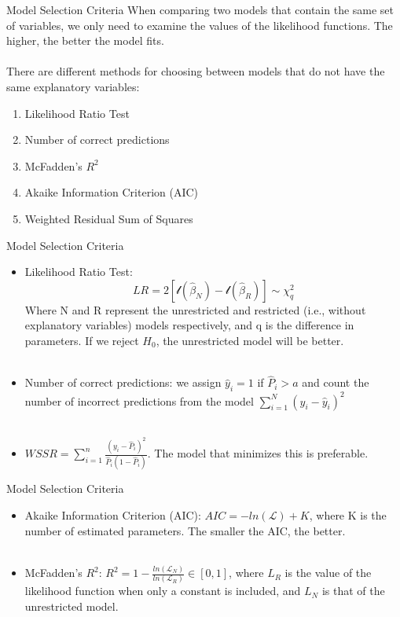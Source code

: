 \documentclass[notes,10pt, aspectratio=169]{beamer}
\begin{document}
\begin{frame}{Model Selection Criteria}
When comparing two models that contain the same set of variables, we only need to examine the values of the likelihood functions. The higher, the better the model fits.\\~\\
There are different methods for choosing between models that do not have the same explanatory variables:
\begin{enumerate}
    \item Likelihood Ratio Test
    \item Number of correct predictions
    \item McFadden's $R^2$
    \item Akaike Information Criterion (AIC)
    \item Weighted Residual Sum of Squares
\end{enumerate}
\end{frame}

\begin{frame}{Model Selection Criteria}
\begin{itemize}
    \item Likelihood Ratio Test:
    \[
    LR=2[\mathscr{l}(\hat{\beta}_N)-\mathscr{l}(\hat{\beta}_R)] \sim \chi_q^2
    \]
Where N and R represent the unrestricted and restricted (i.e., without explanatory variables) models respectively, and q is the difference in parameters. If we reject $H_0$, the unrestricted model will be better. \\~\\

\item Number of correct predictions: we assign $\hat{y}_i=1$ if $\hat{P}_i>a$ and count the number of incorrect predictions from the model $\sum_{i=1}^N (y_i-\hat{y}_i)^2$\\~\\
\item $WSSR=\sum_{i=1}^n \frac{(y_i-\hat{P}_i)^2}{\hat{P}_i(1-\hat{P}_i)}$. The model that minimizes this is preferable.
\end{itemize}
\end{frame}

\begin{frame}{Model Selection Criteria}
\begin{itemize}
    \item Akaike Information Criterion (AIC): $AIC=-ln(\mathcal{L})+K$, where K is the number of estimated parameters. The smaller the AIC, the better.\\~\\
    \item McFadden's $R^2$: $R^2=1-\frac{ln(\mathcal{L}_N)}{ln(\mathcal{L}_R)} \in [0,1]$, where $L_R$ is the value of the likelihood function when only a constant is included, and $L_N$ is that of the unrestricted model.
\end{itemize}
\end{frame}
\end{document}
